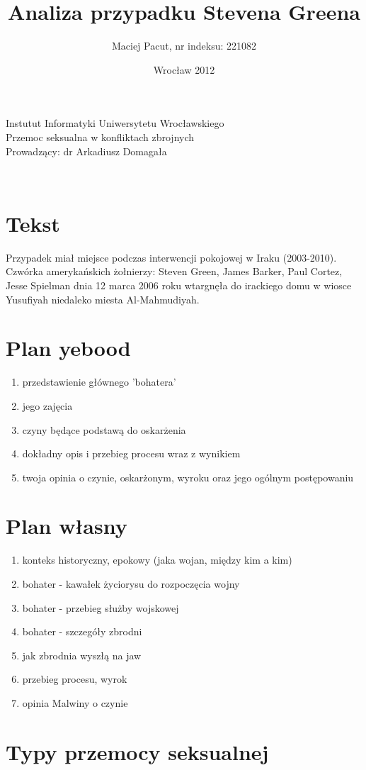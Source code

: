 \documentclass[12pt,a4paper]{article}
\title{Analiza przypadku Stevena Greena}
\author{Maciej Pacut, nr indeksu: 221082}
\date{Wrocław 2012}
\makeatletter
\renewcommand{\maketitle}{\begin{titlepage}
    \vspace*{1cm}
    \begin{center}
      Instutut Informatyki Uniwersytetu Wrocławskiego\\
      Przemoc seksualna w konfliktach zbrojnych \\
      Prowadzący: dr Arkadiusz Domagała \\
      \vspace{3cm}
      \normalsize \@author \par
      \vspace{0.8cm}
      \noindent
      \LARGE \textsc{\@title}\\
      \vspace{1cm}
      \normalsize
    \end{center}
    \vspace{0.5cm}
    \begin{flushright}
      \vspace{5cm}
    \end{flushright}
    \vspace*{\stretch{6}}
    \begin{center}
      \@date
    \end{center}
  \end{titlepage}%
}
\makeatother
\begin{document}
\maketitle
\newpage

\section{Tekst}

Przypadek miał miejsce podczas interwencji pokojowej w Iraku
(2003-2010). Czwórka amerykańskich żołnierzy: Steven Green, James
Barker, Paul Cortez, Jesse Spielman dnia 12 marca 2006 roku wtargnęła
do irackiego domu w wiosce Yusufiyah niedaleko miesta Al-Mahmudiyah.


\section{Plan yebood}

\begin{enumerate}
\item przedstawienie głównego 'bohatera'
\item jego zajęcia
\item czyny będące podstawą do oskarżenia
\item dokładny opis i przebieg procesu wraz z wynikiem
\item twoja opinia o czynie, oskarżonym, wyroku oraz jego ogólnym postępowaniu
\end{enumerate}

\section{Plan własny}

\begin{enumerate}
\item konteks historyczny, epokowy (jaka wojan, między kim a kim)
\item bohater - kawałek życiorysu do rozpoczęcia wojny
\item bohater - przebieg służby wojskowej
\item bohater - szczegóły zbrodni
\item jak zbrodnia wyszłą na jaw
\item przebieg procesu, wyrok
\item opinia Malwiny o czynie
\end{enumerate}

\section{Typy przemocy seksualnej}
\end{document}

